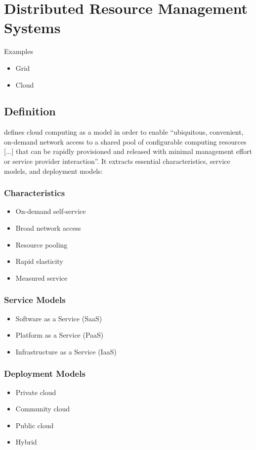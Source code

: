 \section{Distributed Resource Management Systems}
\label{sec:distributed-resources-management-systems}

Examples
\begin{itemize}
  \item Grid
  \item Cloud
\end{itemize}

\subsection{Definition}

 \cite{mell2011} defines cloud computing as a model in order
to enable ``ubiquitous, convenient, on-demand network access to a shared pool of
configurable computing resources [...] that can be rapidly provisioned and
released with minimal management effort or service provider interaction''. It
extracts essential characteristics, service models, and deployment models:

\subsubsection{Characteristics}

\begin{itemize}
  \item On-demand self-service
  \item Broad network access
  \item Resource pooling
  \item Rapid elasticity
  \item Measured service
\end{itemize}

\subsubsection{Service Models}

\begin{itemize}
  \item Software as a Service (SaaS)
  \item Platform as a Service (PaaS)
  \item Infrastructure as a Service (IaaS)
\end{itemize}

\subsubsection{Deployment Models}

\begin{itemize}
  \item Private cloud
  \item Community cloud
  \item Public cloud
  \item Hybrid
\end{itemize}
